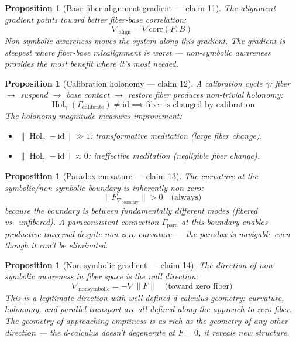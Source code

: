 \documentclass[11pt,a4paper]{article}
\newtheorem{proposition}[definition]{Proposition}
\begin{document}
\begin{proposition}[Base-fiber alignment gradient --- claim 11]
\label{prop:gradient}
The alignment gradient points toward better fiber-base correlation:
\[
  \nabla_{\text{align}} = \nabla \text{corr}(F, B)
\]
Non-symbolic awareness moves the system along this gradient. The
gradient is steepest where fiber-base misalignment is worst ---
non-symbolic awareness provides the most benefit where it's most needed.
\end{proposition}

\begin{proposition}[Calibration holonomy --- claim 12]
\label{prop:holonomy}
A calibration cycle $\gamma$: fiber $\to$ suspend $\to$ base contact
$\to$ restore fiber produces non-trivial holonomy:
\[
  \operatorname{Hol}_\gamma(\Gamma_{\text{calibrate}}) \neq \mathrm{id}
  \implies \text{fiber is changed by calibration}
\]
The holonomy magnitude measures improvement:
\begin{itemize}
  \item $\|\operatorname{Hol}_\gamma - \mathrm{id}\| \gg 1$:
    transformative meditation (large fiber change).
  \item $\|\operatorname{Hol}_\gamma - \mathrm{id}\| \approx 0$:
    ineffective meditation (negligible fiber change).
\end{itemize}
\end{proposition}

\begin{proposition}[Paradox curvature --- claim 13]
\label{prop:boundary}
The curvature at the symbolic/non-symbolic boundary is inherently
non-zero:
\[
  \|F_{\nabla_{\text{boundary}}}\| > 0 \quad \text{(always)}
\]
because the boundary is between fundamentally different modes (fibered
vs.\ unfibered). A paraconsistent connection $\Gamma_{\text{para}}$ at
this boundary enables productive traversal despite non-zero curvature
--- the paradox is navigable even though it can't be eliminated.
\end{proposition}

\begin{proposition}[Non-symbolic gradient --- claim 14]
\label{prop:null}
The direction of non-symbolic awareness in fiber space is the null
direction:
\[
  \nabla_{\text{nonsymbolic}} = -\nabla \|F\| \quad
  \text{(toward zero fiber)}
\]
This is a legitimate direction with well-defined d-calculus geometry:
curvature, holonomy, and parallel transport are all defined along the
approach to zero fiber. The geometry of approaching emptiness is as
rich as the geometry of any other direction --- the d-calculus doesn't
degenerate at $F = 0$, it reveals new structure.
\end{proposition}
\end{document}
